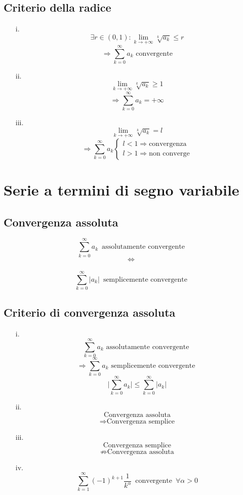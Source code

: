 \documentclass[a4paper,12pt]{report}
\theoremstyle{mystyle}
\begin{document}
\subsection{Criterio della radice}
\begin{enumerate}
    \item[i.] \[\exists r \in (0,1): \lim_{k \rightarrow +\infty} \sqrt[k]{a_k} \leq r  \]
        \[\Rightarrow \sum_{k=0}^\infty a_k \text{ convergente} \]

    \item[ii.] \[\lim_{k \rightarrow +\infty} \sqrt[k]{a_k} \geq 1 \]
        \[\Rightarrow \sum_{k=0}^\infty a_k = + \infty \]

    \item[iii.] \[\lim_{k \rightarrow +\infty} \sqrt[k]{a_k} = l \]
        \[\Rightarrow \sum_{k=0}^\infty a_k
            \begin{cases}
                l<1 \Rightarrow \text{convergenza} \\
                l>1 \Rightarrow \text{non converge}
            \end{cases} \]
\end{enumerate}

\section{Serie a termini di segno variabile}

\subsection{Convergenza assoluta}
\[\sum_{k=0}^\infty a_k \, \text{ assolutamente convergente} \]
\[\Leftrightarrow \]\\
\[\sum_{k=0}^\infty \lvert a_k \rvert \, \text{ semplicemente convergente} \]


\subsection{Criterio di convergenza assoluta}
\begin{enumerate}
    \item[i.] \[\sum_{k=0}^\infty a_k \text{ assolutamente convergente }\]
        \[\Rightarrow \sum_{k=0}^\infty a_k \text{ semplicemente convergente }\]
        \[\lvert \sum_{k=0}^\infty a_k \rvert \leq \sum_{k=0}^\infty \lvert a_k \rvert\]

    \item[ii.] \[\text{Convergenza assoluta}\]
        \[\Rightarrow \text{Convergenza semplice} \]

    \item[iii.] \[\text{Convergenza semplice} \]
        \[\nRightarrow \text{Convergenza assoluta} \]

    \item[iv.] \[\sum_{k=1}^\infty (-1)^{k+1} \frac{1}{k^\alpha} \, \text{ convergente } \, \forall \alpha > 0 \]
\end{enumerate}
\end{document}
